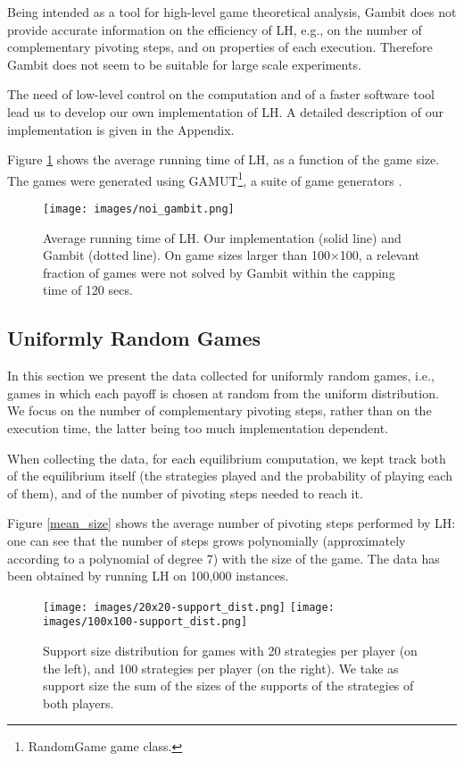 \documentclass[11pt]{article}
\begin{document}
Being intended as a tool for high-level game theoretical analysis,
Gambit does not provide accurate information on the efficiency of
LH, e.g., on the number of complementary pivoting steps, and on
properties of each execution. Therefore Gambit does not seem to be
suitable for large scale experiments.

The need of low-level control on the computation and of a faster
software tool lead us to develop our own implementation of LH. A
detailed description of our implementation is given in the Appendix.

Figure \ref{noi_gambit} shows the average running time of LH, 
as a function of the game size. The games were
generated using GAMUT\footnote{RandomGame game class.}, a suite of game generators \cite{gamut}.

\begin{figure}[h]
\centering
\texttt{[image: images/noi\_gambit.png]}
\caption{Average running time of LH. Our
implementation (solid line) and Gambit (dotted line). On game sizes larger
than 100$\times$100, a relevant fraction of games were not solved by Gambit
within the capping time of 120 secs.}
\label{noi_gambit}
\end{figure}

\subsection{Uniformly Random Games}

In this section we present the data collected for uniformly
random games, i.e., games in which each payoff is chosen at random
from the uniform distribution.
We focus on the number of complementary pivoting steps,
rather than on the execution time, the latter being too much
implementation dependent.

When collecting the data, for each equilibrium computation, we kept
track both of the equilibrium itself (the strategies played and the
probability of playing each of them), and of the number of pivoting
steps needed to reach it.

Figure \ref{mean_size} shows the average number of pivoting steps
performed by LH: one can see that the number of steps grows
polynomially (approximately according to a polynomial of degree 7)
with the size of the game. The data has been obtained by running LH
on 100,000  instances.

\begin{figure}[h]
\centering
\texttt{[image: images/20x20-support\_dist.png]}
\texttt{[image: images/100x100-support\_dist.png]}
\caption{Support size distribution for games with 20 strategies per
player (on the left), and 100 strategies per player (on the right). 
We take as support size the sum of the sizes of the supports of the 
strategies of both players.}
\label{supp_dist}
\end{figure}
\end{document}
